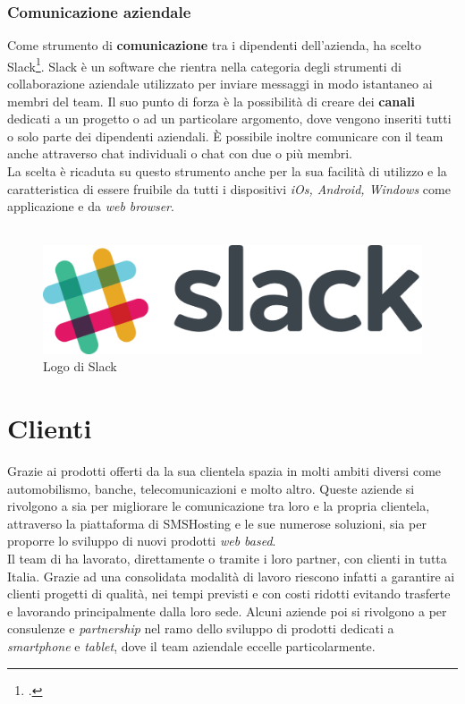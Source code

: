\subsubsection{Comunicazione aziendale}
Come strumento di \textbf{comunicazione} tra i dipendenti dell'azienda, \azienda{} ha scelto Slack\footcite{slack}.
Slack è un software che rientra nella categoria degli strumenti di collaborazione aziendale utilizzato per inviare messaggi in modo istantaneo ai membri del team. Il suo punto di forza è la possibilità di creare dei \textbf{canali} dedicati a un progetto o ad un particolare argomento, dove vengono inseriti tutti o solo parte dei dipendenti aziendali. È possibile inoltre comunicare con il team anche attraverso chat individuali o chat con due o più membri.\\
La scelta è ricaduta su questo strumento anche per la sua facilità di utilizzo e la caratteristica di essere fruibile da tutti i dispositivi \emph{iOs, Android, Windows} come applicazione e da \emph{web browser}.
\\ \\
\begin{figure}[h]
	\centering
	\includegraphics[scale=0.15]{../Immagini/slack.png}
	\caption{Logo di Slack}
\end{figure}
\section{Clienti}
Grazie ai prodotti offerti da \azienda{} la sua clientela spazia in molti ambiti diversi come automobilismo, banche, telecomunicazioni e molto altro. Queste aziende si rivolgono a \azienda{} sia per migliorare le comunicazione tra loro e la propria clientela, attraverso la piattaforma di SMSHosting e le sue numerose soluzioni, sia per proporre lo sviluppo di nuovi prodotti \emph{web based}. \\
Il team di \azienda{} ha lavorato, direttamente o tramite i loro partner, con clienti in tutta Italia. 
Grazie ad una consolidata modalità di lavoro riescono infatti a garantire ai clienti progetti di qualità, nei tempi previsti e con costi ridotti evitando trasferte e lavorando principalmente dalla loro sede. 
Alcuni aziende poi si rivolgono a \azienda{} per consulenze e \emph{partnership} nel ramo dello sviluppo di prodotti dedicati a \emph{smartphone} e \emph{tablet}, dove il team aziendale eccelle particolarmente.

